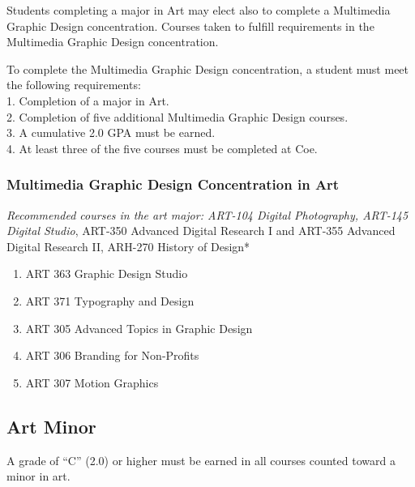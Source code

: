 \documentclass[
  letterpaper,
]{scrbook}
\providecommand{\tightlist}{%
  \setlength{\itemsep}{0pt}\setlength{\parskip}{0pt}}
\begin{document}
Students completing a major in Art may elect also to complete a
Multimedia Graphic Design concentration. Courses taken to fulfill
requirements in the Multimedia Graphic Design concentration.

To complete the Multimedia Graphic Design concentration, a student must
meet the following requirements:\\
1. Completion of a major in Art.\\
2. Completion of five additional Multimedia Graphic Design courses.\\
3. A cumulative 2.0 GPA must be earned.\\
4. At least three of the five courses must be completed at Coe.

\subsubsection{Multimedia Graphic Design Concentration in
Art}\label{multimedia-graphic-design-concentration-in-art}

\emph{Recommended courses in the art major: ART-104 Digital Photography,
ART-145 Digital Studio}, ART-350 Advanced Digital Research I and ART-355
Advanced Digital Research II, ARH-270 History of Design*

\begin{enumerate}
\def\labelenumi{\arabic{enumi}.}
\tightlist
\item
  ART 363 Graphic Design Studio\\
\item
  ART 371 Typography and Design\\
\item
  ART 305 Advanced Topics in Graphic Design\\
\item
  ART 306 Branding for Non-Profits\\
\item
  ART 307 Motion Graphics
\end{enumerate}

\subsection{Art Minor}\label{art-minor}

A grade of ``C'' (2.0) or higher must be earned in all courses counted
toward a minor in art.
\end{document}
